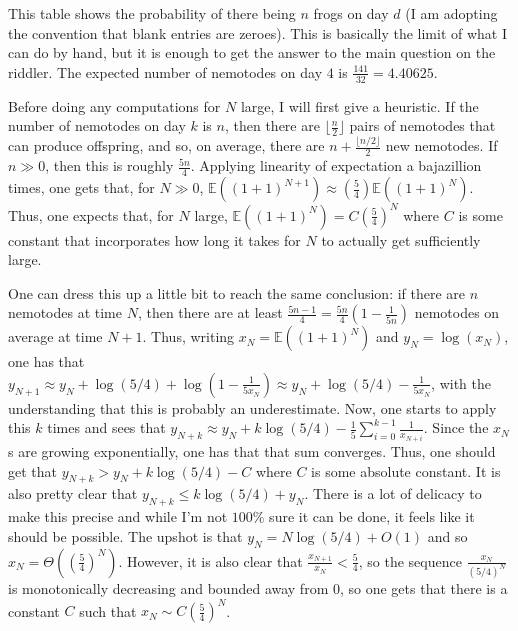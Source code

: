 \documentclass[11pt]{article}
\theoremstyle{definition}
\begin{document}
This table shows the probability of there being $n$ frogs on day $d$ (I am adopting the convention that blank entries are zeroes).  This is basically the limit of what I can do by hand, but it is enough to get the answer to the main question on the riddler.  The expected number of nemotodes on day $4$ is $\frac{141}{32} = 4.40625$.

Before doing any computations for $N$ large, I will first give a heuristic.  If the number of nemotodes on day $k$ is $n$, then there are $\lfloor\frac{n}{2}\rfloor$ pairs of nemotodes that can produce offspring, and so, on average, there are $n + \frac{\lfloor n/2\rfloor}{2}$ new nemotodes.  If $n \gg 0$, then this is roughly $\frac{5n}{4}$.  Applying linearity of expectation a bajazillion times, one gets that, for $N \gg 0$, $\mathbb{E}\left((1+1)^{N+1}\right) \approx \left(\frac{5}{4}\right)\mathbb{E}\left((1+1)^{N}\right).$  Thus, one expects that, for $N$ large, $\mathbb{E}\left((1+1)^{N}\right) = C \left(\frac{5}{4}\right)^N$ where $C$ is some constant that incorporates how long it takes for $N$ to actually get sufficiently large.

One can dress this up a little bit to reach the same conclusion: if there are $n$ nemotodes at time $N$, then there are at least $\frac{5n-1}{4} = \frac{5n}{4}\left(1-\frac{1}{5n}\right)$ nemotodes on average at time $N+1$.  Thus, writing $x_N = \mathbb{E}\left((1+1)^{N}\right)$ and $y_N = \log(x_N)$, one has that $y_{N+1} \approx y_N + \log(5/4) + \log\left(1-\frac{1}{5x_N}\right) \approx y_N + \log(5/4) - \frac{1}{5x_N}$, with the understanding that this is probably an underestimate.  Now, one starts to apply this $k$ times and sees that $y_{N+k} \approx y_N + k\log(5/4) - \displaystyle{\frac{1}{5}\sum_{i = 0}^{k-1}\frac{1}{x_{N+i}}}$.  Since the $x_N$s are growing exponentially, one has that that sum converges.  Thus, one should get that $y_{N+k} > y_N + k \log(5/4) -C$ where $C$ is some absolute constant.  It is also pretty clear that $y_{N+k} \leq k\log(5/4) + y_N$.  There is a lot of delicacy to make this precise and while I'm not $100\%$ sure it can be done, it feels like it should be possible.  The upshot is that $y_N = N\log(5/4) + O(1)$ and so $x_N = \Theta\left(\left(\frac{5}{4}\right)^N\right)$.  However, it is also clear that $\frac{x_{N+1}}{x_N} < \frac{5}{4}$, so the sequence $\frac{x_N}{(5/4)^N}$ is monotonically decreasing and bounded away from $0$, so one gets that there is a constant $C$ such that $x_N \sim C\left(\frac{5}{4}\right)^N$.
\end{document}
